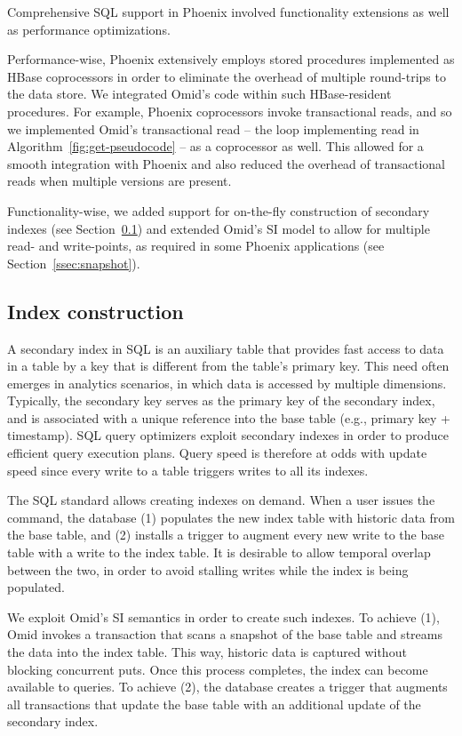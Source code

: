 

Comprehensive SQL support in Phoenix involved functionality extensions as well 
as performance optimizations. 

Performance-wise, 
Phoenix extensively employs stored procedures implemented as HBase coprocessors
in order to eliminate the overhead of multiple round-trips to the data store. 
We integrated Omid's code within such HBase-resident procedures.
For example, Phoenix coprocessors invoke transactional reads, and so we implemented Omid's 
transactional read -- the loop implementing read in Algorithm~\ref{fig:get-pseudocode} -- as a coprocessor as well. 
This allowed for a smooth integration  with Phoenix and also reduced the overhead of transactional
reads when multiple versions are present.

Functionality-wise, we added support for on-the-fly construction of secondary indexes
(see Section~\ref{ssec:indexes}) and extended 
Omid's SI model to allow for multiple read- and write-points, as required 
in some Phoenix applications (see Section~\ref{ssec:snapshot}). 

\subsection{Index construction}
\label{ssec:indexes}

A secondary index in SQL is an auxiliary table that provides fast access to data in a table 
by a key that is different from the table's primary key. This need often emerges in analytics scenarios, in
which data is accessed by multiple dimensions. Typically, the secondary key serves as the 
primary key of the secondary index, and is associated with a unique reference into the base table 
(e.g., primary key + timestamp). SQL query 
optimizers exploit secondary indexes in order to produce efficient query execution plans. Query speed 
is therefore at odds with update speed since every write to a table triggers writes to all its indexes. 

The SQL standard allows creating indexes on demand. When a user issues the {} 
command, the database (1) populates the new index table with historic data from the base table, and
(2) installs a trigger to augment every new write to the base table with a write to the index table. 
It is desirable to allow temporal overlap between the two, in order to avoid stalling  writes while 
the index is being populated. 

We exploit Omid's SI semantics in order to create such indexes. To achieve (1), Omid invokes a 
transaction that scans a snapshot of the base table and streams the data into the  
index table. This way, historic data is captured without blocking concurrent puts. Once this 
process completes, the index can become available to queries. 
To achieve (2), the database creates a trigger that augments all transactions that update the base table 
with an additional update of the secondary index. 
 
